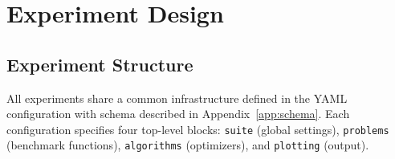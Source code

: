 %
%
%
%

\chapter{Experiment Design}
\label{cha:exper}

\section{Experiment Structure}
\label{sec:exper:structure}

All experiments share a common infrastructure defined in the YAML
configuration with schema described in Appendix~\ref{app:schema}.
Each configuration specifies four top-level blocks: \texttt{suite}
(global settings), \texttt{problems} (benchmark functions),
\texttt{algorithms} (optimizers), and \texttt{plotting} (output).

